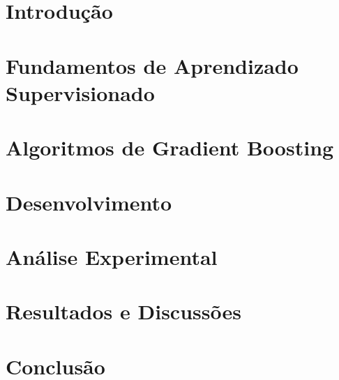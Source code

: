 \documentclass[doutorado, pos-defesa]{packages/icmc}
\begin{document}
\chapter{Introdução}
\label{chapter:introducao}


\chapter{Fundamentos de Aprendizado Supervisionado}
\label{chapter:fundamentos-aprendizado}


\chapter{Algoritmos de Gradient Boosting}
\label{chapter:algoritmos-boosting}


\chapter{Desenvolvimento}
\label{chapter:desenvolvimento}


\chapter{Análise Experimental}
\label{chapter:experimental}


\chapter{Resultados e Discussões}
\label{chapter:resultados}


\chapter{Conclusão}
\label{chapter:conclusao}


% 

% 
\end{document}
